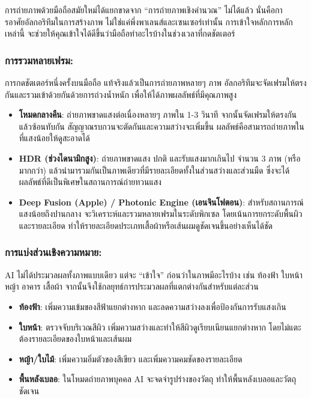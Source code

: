 
การถ่ายภาพด้วยมือถือสมัยใหม่ได้แยกขาดจาก “การถ่ายภาพเชิงคำนวณ” ไม่ได้แล้ว นั่นคือการอาศัยอัลกอริทึมในการสร้างภาพ ไม่ใช่แค่พึ่งพาเลนส์และเซนเซอร์เท่านั้น การเข้าใจหลักการหลักเหล่านี้ จะช่วยให้คุณเข้าใจได้ดีขึ้นว่ามือถือทำอะไรบ้างในช่วงเวลาที่กดชัตเตอร์

\subsubsection*{การรวมหลายเฟรม:}

การกดชัตเตอร์หนึ่งครั้งบนมือถือ แท้จริงแล้วเป็นการถ่ายภาพหลายๆ ภาพ อัลกอริทึมจะจัดเฟรมให้ตรงกันและรวมเข้าด้วยกันด้วยการถ่วงน้ำหนัก เพื่อให้ได้ภาพผลลัพธ์ที่มีคุณภาพสูง

\begin{itemize}
  \item \textbf{โหมดกลางคืน}: ถ่ายภาพขาดแสงต่อเนื่องหลายๆ ภาพใน 1-3 วินาที จากนั้นจัดเฟรมให้ตรงกันแล้วซ้อนทับกัน สัญญาณรบกวนจะตัดกันและความสว่างจะเพิ่มขึ้น ผลลัพธ์คือสามารถถ่ายภาพในที่แสงน้อยให้ดูสะอาดได้
  \item \textbf{HDR (ช่วงไดนามิกสูง)}: ถ่ายภาพขาดแสง ปกติ และรับแสงมากเกินไป จำนวน 3 ภาพ (หรือมากกว่า) แล้วนำมารวมกันเป็นภาพเดียวที่มีรายละเอียดทั้งในส่วนสว่างและส่วนมืด ซึ่งจะได้ผลลัพธ์ที่ดีเป็นพิเศษในสถานการณ์ถ่ายทวนแสง
  \item \textbf{Deep Fusion (Apple) / Photonic Engine (เอนจินโฟตอน)}: สำหรับสถานการณ์แสงน้อยถึงปานกลาง จะวิเคราะห์และรวมหลายเฟรมในระดับพิกเซล โดยเน้นการยกระดับพื้นผิวและรายละเอียด ทำให้รายละเอียดประเภทเสื้อผ้าหรือเส้นผมดูชัดเจนขึ้นอย่างเห็นได้ชัด
\end{itemize}

\subsubsection*{การแบ่งส่วนเชิงความหมาย:}

AI ไม่ได้ประมวลผลทั้งภาพแบบเดียว แต่จะ “เข้าใจ” ก่อนว่าในภาพมีอะไรบ้าง เช่น ท้องฟ้า ใบหน้า หญ้า อาคาร เสื้อผ้า จากนั้นจึงใช้กลยุทธ์การประมวลผลที่แตกต่างกันสำหรับแต่ละส่วน

\begin{itemize}
  \item \textbf{ท้องฟ้า}: เพิ่มความเข้มของสีฟ้าแยกต่างหาก และลดความสว่างลงเพื่อป้องกันการรับแสงเกิน
  \item \textbf{ใบหน้า}: ตรวจจับบริเวณสีผิว เพิ่มความสว่างและทำให้สีผิวดูเรียบเนียนแยกต่างหาก โดยไม่แตะต้องรายละเอียดของใบหน้าและเส้นผม
  \item \textbf{หญ้า/ใบไม้}: เพิ่มความอิ่มตัวของสีเขียว และเพิ่มความคมชัดของรายละเอียด
  \item \textbf{พื้นหลังเบลอ}: ในโหมดถ่ายภาพบุคคล AI จะจดจำรูปร่างของวัตถุ ทำให้พื้นหลังเบลอและวัตถุชัดเจน
\end{itemize}

